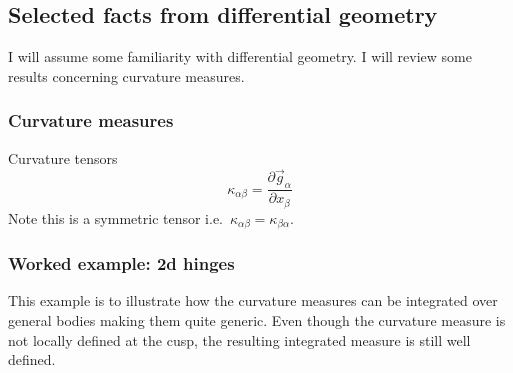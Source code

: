 \subsection{Selected facts from differential geometry}

I will assume some familiarity with differential geometry.
I will review some results concerning curvature measures.

\subsubsection{Curvature measures}

Curvature tensors
\begin{equation}
  \kappa_{\alpha\beta} = \frac{\partial \vec{g}_\alpha}{\partial x_\beta}
\end{equation}
Note this is a symmetric tensor i.e.\ $\kappa_{\alpha\beta} = \kappa_{\beta\alpha}$.

\subsubsection{Worked example: 2d hinges}

This example is to illustrate how the curvature measures can be integrated over general bodies making them quite generic.
Even though the curvature measure is not locally defined at the cusp, the resulting integrated measure is still well defined.

